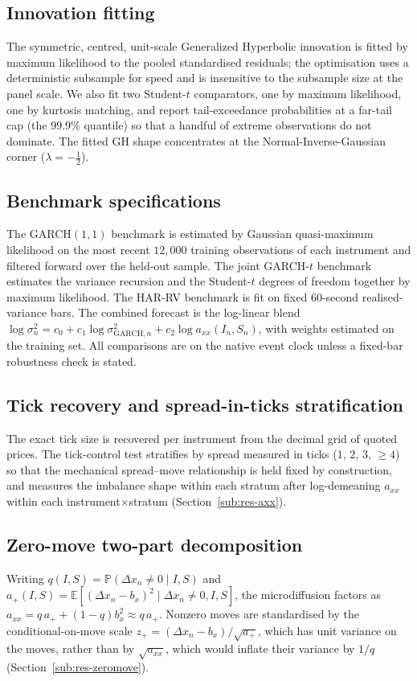 \documentclass[11pt]{article}
\theoremstyle{plain}
\theoremstyle{definition}
\newcommand{\E}{\mathbb{E}}
\newcommand{\axx}{a_{xx}}
\begin{document}
\subsection{Innovation fitting}
\label{app:ghfit}
The symmetric, centred, unit-scale Generalized Hyperbolic innovation is fitted by maximum
likelihood to the pooled standardised residuals; the optimisation uses a deterministic
subsample for speed and is insensitive to the subsample size at the panel scale. We also
fit two Student-$t$ comparators, one by maximum likelihood, one by kurtosis
matching, and report tail-exceedance probabilities at a far-tail cap (the $99.9\%$
quantile) so that a handful of extreme observations do not dominate. The fitted GH shape
concentrates at the Normal-Inverse-Gaussian corner ($\lambda=-\tfrac12$).

\subsection{Benchmark specifications}
\label{app:benchmarks}
The GARCH$(1,1)$ benchmark is estimated by Gaussian quasi-maximum likelihood on the most
recent $12{,}000$ training observations of each instrument and filtered forward over the
held-out sample. The joint GARCH-$t$ benchmark estimates the variance recursion and the
Student-$t$ degrees of freedom together by maximum likelihood. The HAR-RV benchmark is fit
on fixed $60$-second realised-variance bars. The combined forecast is the log-linear
blend $\log\sigma^2_n = c_0 + c_1\log\sigma^2_{\mathrm{GARCH},n} + c_2\log\axx(I_n,S_n)$,
with weights estimated on the training set. All comparisons are on the native event clock
unless a fixed-bar robustness check is stated.

\subsection{Tick recovery and spread-in-ticks stratification}
\label{app:tick}
The exact tick size is recovered per instrument from the decimal grid of quoted prices.
The tick-control test stratifies by spread measured in ticks ($1$, $2$, $3$, $\ge 4$) so
that the mechanical spread--move relationship is held fixed by construction, and measures
the imbalance shape within each stratum after log-demeaning $\axx$ within each
instrument$\times$stratum (Section~\ref{sub:res-axx}).

\subsection{Zero-move two-part decomposition}
\label{app:zeromove-detail}
Writing $q(I,S)=\mathbb{P}(\Delta x_n\neq 0\mid I,S)$ and
$a_+(I,S)=\E[(\Delta x_n-b_x)^2\mid \Delta x_n\neq 0, I,S]$, the microdiffusion factors as
$\axx = q\,a_+ + (1-q)b_x^2 \approx q\,a_+$. Nonzero moves are standardised by the
conditional-on-move scale $z_+=(\Delta x_n-b_x)/\sqrt{a_+}$, which has unit variance on the
moves, rather than by $\sqrt{\axx}$, which would inflate their variance by $1/q$
(Section~\ref{sub:res-zeromove}).
\end{document}
